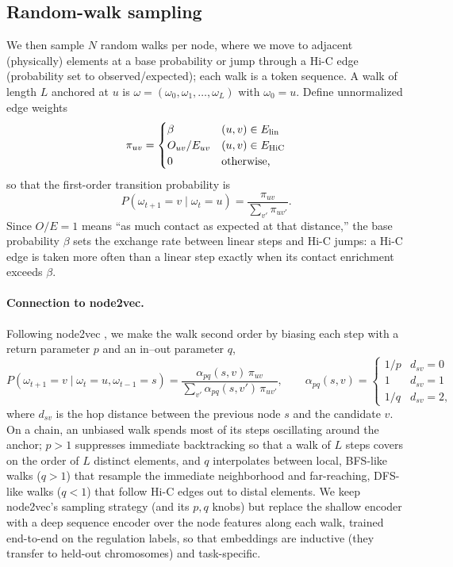 \subsection{Random-walk sampling}
\label{sec:walks}
We then sample $N$ random walks per node, where we move to adjacent (physically) elements at a base probability or jump through a Hi-C edge (probability set to observed/expected); each walk is a token sequence. A walk of length $L$ anchored at $u$ is $\omega=(\omega_0,\omega_1,\ldots,\omega_L)$ with $\omega_0=u$. Define unnormalized edge weights
\begin{equation}\label{eq:pi}
  \pi_{uv}=
  \begin{cases}
    \beta & (u,v)\in E_{\mathrm{lin}}\\
    O_{uv}/E_{uv} & (u,v)\in E_{\mathrm{HiC}}\\
    0 & \text{otherwise,}
  \end{cases}
\end{equation}
so that the first-order transition probability is
\begin{equation}\label{eq:first}
  P(\omega_{t+1}=v\mid\omega_t=u)=\frac{\pi_{uv}}{\sum_{v'}\pi_{uv'}}.
\end{equation}
Since $O/E=1$ means ``as much contact as expected at that distance,'' the base probability $\beta$ sets the exchange rate between linear steps and Hi-C jumps: a Hi-C edge is taken more often than a linear step exactly when its contact enrichment exceeds $\beta$.

\paragraph{Connection to node2vec.}
Following node2vec \cite{grover2016node2vec}, we make the walk second order by biasing each step with a return parameter $p$ and an in--out parameter $q$,
\begin{equation}\label{eq:second}
  P(\omega_{t+1}=v\mid\omega_t=u,\omega_{t-1}=s)
  =\frac{\alpha_{pq}(s,v)\,\pi_{uv}}{\sum_{v'}\alpha_{pq}(s,v')\,\pi_{uv'}},
  \qquad
  \alpha_{pq}(s,v)=
  \begin{cases}
    1/p & d_{sv}=0\\
    1   & d_{sv}=1\\
    1/q & d_{sv}=2,
  \end{cases}
\end{equation}
where $d_{sv}$ is the hop distance between the previous node $s$ and the candidate $v$. On a chain, an unbiased walk spends most of its steps oscillating around the anchor; $p>1$ suppresses immediate backtracking so that a walk of $L$ steps covers on the order of $L$ distinct elements, and $q$ interpolates between local, BFS-like walks ($q>1$) that resample the immediate neighborhood and far-reaching, DFS-like walks ($q<1$) that follow Hi-C edges out to distal elements. We keep node2vec's sampling strategy (and its $p,q$ knobs) but replace the shallow encoder with a deep sequence encoder over the node features along each walk, trained end-to-end on the regulation labels, so that embeddings are inductive (they transfer to held-out chromosomes) and task-specific.

